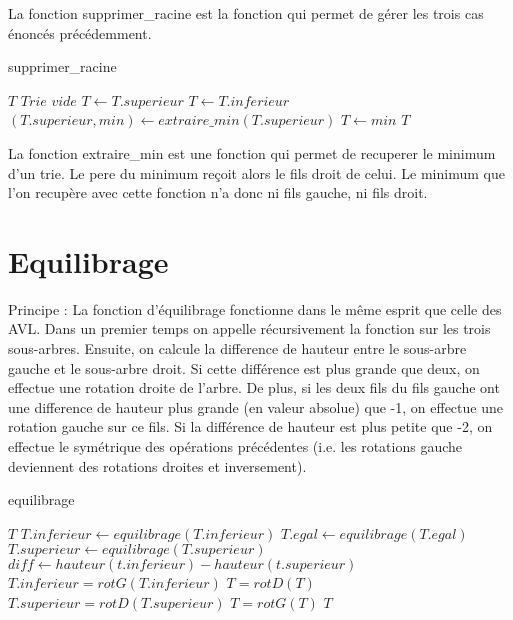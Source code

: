 \documentclass[10pt]{report}
\begin{document}
La fonction supprimer\_racine est la fonction qui permet de gérer les trois cas énoncés précédemment.

\begin{algorithm}
  \caption{supprimer\_racine}
  \begin{algorithmic}[1]
     $T$
     $Trie$ $vide$
    \State $T \gets T.superieur$ 
    \State $T \gets T.inferieur$ 
    \Else {}
    \State $(T.superieur,min) \gets extraire\_min(T.superieur)$
    \State $T \gets min$
    \EndIf
     $T$
    \EndFunction
  \end{algorithmic}
\end{algorithm}

La fonction extraire\_min est une fonction qui permet de recuperer le minimum d'un trie. Le pere du minimum reçoit alors le fils droit de celui. Le minimum que l'on recupère avec cette fonction n'a donc ni fils gauche, ni fils droit.

\section{Equilibrage} 
Principe : La fonction d'équilibrage fonctionne dans le même esprit que celle des AVL. Dans un premier temps on appelle récursivement la fonction sur les trois sous-arbres. Ensuite, on calcule la difference de hauteur entre le sous-arbre gauche et le sous-arbre droit. Si cette différence est plus grande que deux, on effectue une rotation droite de l'arbre. De plus, si les deux fils du fils gauche ont une difference de hauteur plus grande (en valeur absolue) que -1, on effectue une rotation gauche sur ce fils. Si la différence de hauteur est plus petite que -2, on effectue le symétrique des opérations précédentes (i.e. les rotations gauche deviennent des rotations droites et inversement).
\begin{algorithm}
  \caption{equilibrage}
  \begin{algorithmic}[1]
     $T$
    \EndIf
    \State $T.inferieur \gets equilibrage(T.inferieur)$
    \State $T.egal \gets equilibrage(T.egal)$
    \State $T.superieur \gets equilibrage(T.superieur)$
    \State $diff \gets hauteur(t.inferieur)-hauteur(t.superieur)$
    \State $T.inferieur=rotG(T.inferieur)$
    \EndIf  
    \State $T=rotD(T)$
    \State $T.superieur=rotD(T.superieur)$
    \EndIf  
    \State $T=rotG(T)$
    \EndIf
     $T$
    \EndFunction
  \end{algorithmic}
\end{algorithm}
\end{document}
